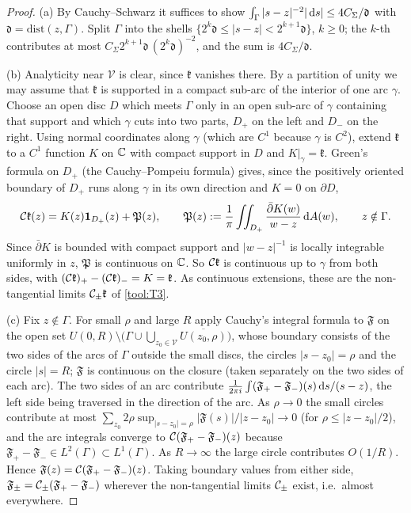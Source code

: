\begin{proof}
(a) By Cauchy--Schwarz it suffices to show $\int_\Gamma|s-z|^{-2}|\,\mathrm{d} s|\le4C_\Sigma/\mathfrak d$ with $\mathfrak d=
\mathrm{dist}(z,\Gamma)$. Split $\Gamma$ into the shells $\{2^k\mathfrak d\le|s-z|<2^{k+1}\mathfrak d\}$, $k\ge0$; the
$k$-th contributes at most $C_\Sigma2^{k+1}\mathfrak d\,(2^k\mathfrak d)^{-2}$, and the sum is $4C_\Sigma/\mathfrak d$.

(b) Analyticity near $\mathcal V$ is clear, since $\mathfrak k$ vanishes there. By a partition of unity we may assume
that $\mathfrak k$ is supported in a compact sub-arc of the interior of one arc $\gamma$. Choose an open disc $D$ which
meets $\Gamma$ only in an open sub-arc of $\gamma$ containing that support and which $\gamma$ cuts into two parts, $D_+$
on the left and $D_-$ on the right. Using normal coordinates along $\gamma$ (which are $C^1$ because $\gamma$ is $C^2$),
extend $\mathfrak k$ to a $C^1$ function $K$ on $\mathbb{C}$ with compact support in $D$ and $K|_\gamma=\mathfrak k$. Green's
formula on $D_+$ (the Cauchy--Pompeiu formula) gives, since the positively oriented boundary of $D_+$ runs along
$\gamma$ in its own direction and $K=0$ on $\partial D$,
\[
  \mathcal{C}\mathfrak k(z)=K(z)\mathbf 1_{D_+}(z)+\mathfrak P(z),\qquad
  \mathfrak P(z):=\frac1\pi\iint_{D_+}\frac{\bar\partial K(w)}{w-z}\,\mathrm{d} A(w),\qquad z\notin\Gamma .
\]
Since $\bar\partial K$ is bounded with compact support and $|w-z|^{-1}$ is locally integrable uniformly in $z$, $\mathfrak P$
is continuous on $\mathbb{C}$. So $\mathcal{C}\mathfrak k$ is continuous up to $\gamma$ from both sides, with
$(\mathcal{C}\mathfrak k)_+-(\mathcal{C}\mathfrak k)_-=K=\mathfrak k$. As continuous extensions, these are the non-tangential
limits $\mathcal{C}_\pm\mathfrak k$ of \ref{tool:T3}.

(c) Fix $z\notin\Gamma$. For small $\rho$ and large $R$ apply Cauchy's integral formula to $\mathfrak F$ on the open set
$U(0,R)\setminus\bigl(\Gamma\cup\bigcup_{z_0\in\mathcal V}\overline{U(z_0,\rho)}\bigr)$, whose boundary consists of the two sides
of the arcs of $\Gamma$ outside the small discs, the circles $|s-z_0|=\rho$ and the circle $|s|=R$; $\mathfrak F$ is continuous on
the closure (taken separately on the two sides of each arc). The two sides of an arc contribute
$\frac1{2\pi i}\int(\mathfrak F_+-\mathfrak F_-)(s)\,\mathrm{d} s/(s-z)$, the left side being traversed in the direction of the arc. As $\rho\to0$
the small circles contribute at most $\sum_{z_0}2\rho\sup_{|s-z_0|=\rho}|\mathfrak F(s)|/|z-z_0|\to0$ (for $\rho\le|z-z_0|/2$), and the
arc integrals converge to $\mathcal{C}(\mathfrak F_+-\mathfrak F_-)(z)$ because $\mathfrak F_+-\mathfrak F_-\in L^2(\Gamma)\subset L^1(\Gamma)$. As $R\to\infty$ the large
circle contributes $O(1/R)$. Hence $\mathfrak F(z)=\mathcal{C}(\mathfrak F_+-\mathfrak F_-)(z)$. Taking boundary values from either side,
$\mathfrak F_\pm=\mathcal{C}_\pm(\mathfrak F_+-\mathfrak F_-)$ wherever the non-tangential limits $\mathcal{C}_\pm$ exist, i.e.\ almost everywhere.
\end{proof}

